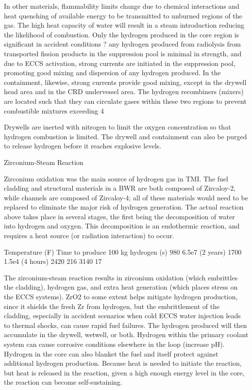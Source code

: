 \documentclass[10pt]{article}
\begin{document}
In other materials, flammability limits change due to chemical interactions and heat quenching of available energy to be transmitted to unburned regions of the gas. The high heat capacity of water will result in a steam introduction reducing the likelihood of combustion. Only the hydrogen produced in the core region is significant in accident conditions ? any hydrogen produced from radiolysis from transported fission products in the suppression pool is minimal in strength, and due to ECCS activation, strong currents are initiated in the suppression pool, promoting good mixing and dispersion of any hydrogen produced. In the containment, likewise, strong currents provide good mixing, except in the drywell head area and in the CRD undervessel area. The hydrogen recombiners (mixers) are located such that they can circulate gases within these two regions to prevent combustible mixtures exceeding 4%

Drywells are inerted with nitrogen to limit the oxygen concentration so that hydrogen combustion is limited. The drywell and containment can also be purged to release hydrogen before it reaches explosive levels. 


Zirconium-Steam Reaction


Zirconium oxidation was the main source of hydrogen gas in TMI. The fuel cladding and structural materials in a BWR are both composed of Zircaloy-2, while channels are composed of Zircaloy-4; all of these materials would need to be replaced to eliminate the major risk of hydrogen generation. The actual reaction above takes place in several stages, the first being the decomposition of water into hydrogen and oxygen. This decomposition is an endothermic reaction, and requires a heat source (or radiation interaction) to occur. 

Temperature (F)
Time to produce 100 kg hydrogen (s)
980
6.5e7 (2 years)
1700
1.5e4 (4 hours)
2420
216
3140
17

The zirconium-steam reaction results in zirconium oxidation (which embrittles the cladding), hydrogen gas, and extra heat generation (which places stress on the ECCS systems). ZrO2 to some extent helps mitigate hydrogen production, since it shields the fresh Zr from hydrogen, but the embrittlement of the cladding, especially in accident scenarios when cold ECCS water injection leads to thermal shocks, can cause rapid fuel failures. The hydrogen produced will then accumulate in the drywell, wetwell, or both. Hydrogen within the primary coolant system can cause corrosive conditions elsewhere in the loop (increase pH). Hydrogen in the core can also blanket the fuel and itself protect against additional hydrogen production. Because heat is needed to initiate the reaction, but heat is released in the reaction, given a high enough energy level in the core, the reaction can become self-sustaining. 
\end{document}
